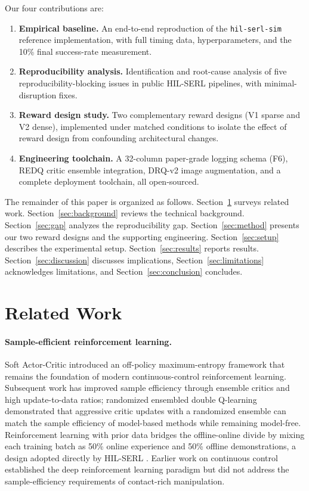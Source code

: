 \documentclass[12pt,a4paper]{article}
\begin{document}
Our four contributions are:
\begin{enumerate}
\item \textbf{Empirical baseline.} An end-to-end reproduction of the \texttt{hil-serl-sim} reference implementation, with full timing data, hyperparameters, and the 10\% final success-rate measurement.
\item \textbf{Reproducibility analysis.} Identification and root-cause analysis of five reproducibility-blocking issues in public HIL-SERL pipelines, with minimal-disruption fixes.
\item \textbf{Reward design study.} Two complementary reward designs (V1 sparse and V2 dense), implemented under matched conditions to isolate the effect of reward design from confounding architectural changes.
\item \textbf{Engineering toolchain.} A 32-column paper-grade logging schema (F6), REDQ critic ensemble integration, DRQ-v2 image augmentation, and a complete deployment toolchain, all open-sourced.
\end{enumerate}

The remainder of this paper is organized as follows. Section~\ref{sec:related} surveys related work. Section~\ref{sec:background} reviews the technical background. Section~\ref{sec:gap} analyzes the reproducibility gap. Section~\ref{sec:method} presents our two reward designs and the supporting engineering. Section~\ref{sec:setup} describes the experimental setup. Section~\ref{sec:results} reports results. Section~\ref{sec:discussion} discusses implications, Section~\ref{sec:limitations} acknowledges limitations, and Section~\ref{sec:conclusion} concludes.

\section{Related Work} \label{sec:related}

\paragraph{Sample-efficient reinforcement learning.} Soft Actor-Critic \citep{haarnoja2018soft} introduced an off-policy maximum-entropy framework that remains the foundation of modern continuous-control reinforcement learning. Subsequent work has improved sample efficiency through ensemble critics and high update-to-data ratios; randomized ensembled double Q-learning \citep[REDQ;][]{chen2021randomized} demonstrated that aggressive critic updates with a randomized ensemble can match the sample efficiency of model-based methods while remaining model-free. Reinforcement learning with prior data \citep[RLPD;][]{ball2023efficient} bridges the offline-online divide by mixing each training batch as 50\% online experience and 50\% offline demonstrations, a design adopted directly by HIL-SERL \citep{luo2024serl}. Earlier work on continuous control \citep{lillicrap2016continuous,schulman2017proximal,mnih2015human} established the deep reinforcement learning paradigm but did not address the sample-efficiency requirements of contact-rich manipulation.
\end{document}

